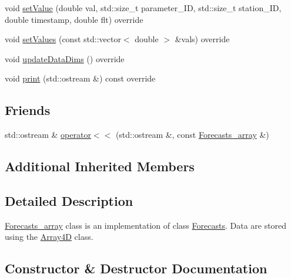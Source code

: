 \begin{DoxyCompactItemize}
\item 
void \mbox{\hyperlink{class_forecasts__array_a7224d8333630fcd162a1b69b49241d2f}{set\+Value}} (double val, std\+::size\+\_\+t parameter\+\_\+\+ID, std\+::size\+\_\+t station\+\_\+\+ID, double timestamp, double flt) override
\item 
void \mbox{\hyperlink{class_forecasts__array_af31e7741f2e048593cbec1c317210b65}{set\+Values}} (const std\+::vector$<$ double $>$ \&vals) override
\item 
void \mbox{\hyperlink{class_forecasts__array_ab3fc780bb6a5cbf132457c8c336bc777}{update\+Data\+Dims}} () override
\item 
void \mbox{\hyperlink{class_forecasts__array_a56985347f516340034b29dc4cdda87b1}{print}} (std\+::ostream \&) const override
\end{DoxyCompactItemize}
\subsection*{Friends}
\begin{DoxyCompactItemize}
\item 
std\+::ostream \& \mbox{\hyperlink{class_forecasts__array_a6bde933a6e00ad1328f834e4f5d98606}{operator$<$$<$}} (std\+::ostream \&, const \mbox{\hyperlink{class_forecasts__array}{Forecasts\+\_\+array}} \&)
\end{DoxyCompactItemize}
\subsection*{Additional Inherited Members}


\subsection{Detailed Description}
\mbox{\hyperlink{class_forecasts__array}{Forecasts\+\_\+array}} class is an implementation of class \mbox{\hyperlink{class_forecasts}{Forecasts}}. Data are stored using the \mbox{\hyperlink{class_array4_d}{Array4D}} class. 

\subsection{Constructor \& Destructor Documentation}
\mbox{\label{class_forecasts__array_a4304d0d78a0c475b3392c99e14c0891b}} 
